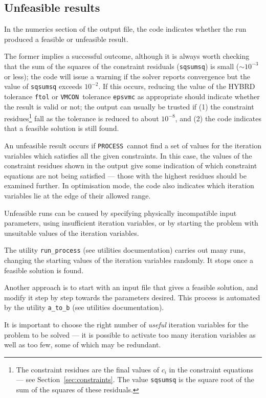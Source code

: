 \documentclass[11pt,a4paper]{report}
\newcommand{\process}{\mbox{\texttt{PROCESS}}}
\newcommand{\vmcon}{\mbox{\texttt{VMCON}}}
\begin{document}
\subsection{Unfeasible results}

In the numerics section of the output file, the code indicates whether the run
produced a feasible or unfeasible result.

The former implies a successful outcome, although it is always worth checking
that the sum of the squares of the constraint residuals (\texttt{sqsumsq}) is small ($\sim
10^{-3}$ or less); the code will issue a warning if the solver reports convergence but
the value of \texttt{sqsumsq} exceeds $10^{-2}$. If this occurs, reducing the
value of the HYBRD tolerance \texttt{ftol} or \vmcon\ tolerance
\texttt{epsvmc} as appropriate should indicate whether the result is valid
or not; the output can usually be trusted if (1) the constraint
residues\footnote{The constraint residues are the final values of $c_i$ in the
  constraint equations --- see Section~\ref{sec:constraints}. The value
  \texttt{sqsumsq} is the square root of the sum of the squares of these
  residuals.} fall as the tolerance is reduced to about $10^{-8}$, and (2) the
code indicates that a feasible solution is still found.

An unfeasible result occurs if \process\ cannot find a set of values for the
iteration variables which satisfies all the given constraints. In this case,
the values of the constraint residues shown in the output give some indication
of which constraint equations are not being satisfied --- those with the
highest residues should be examined further. In optimisation mode, the code
also indicates which iteration variables lie at the edge of their allowed
range.

Unfeasible runs can be caused by specifying physically incompatible input parameters,  using insufficient iteration variables, or by starting the problem with unsuitable values of the iteration variables.

The utility \texttt{run\_process} (see utilities documentation) carries out many runs, changing the starting values of the iteration variables randomly.  It stops once a feasible solution is found.

Another approach is to start with an input file that gives a feasible solution, and modify it step by step towards the parameters desired.  This process is automated by the
utility \texttt{a\_to\_b} (see utilities documentation).

It is important to choose the right number of \textit{useful}\/ iteration variables for the
problem to be solved --- it is possible to activate too many iteration variables as well as too few, some of which may be redundant.
\end{document}
